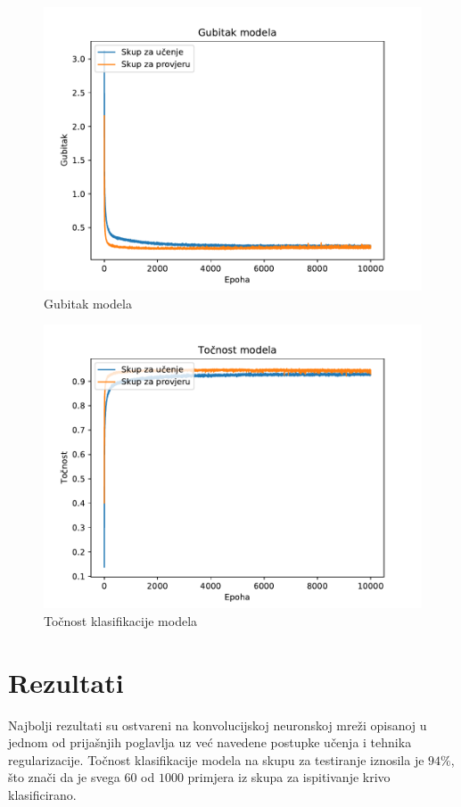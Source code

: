 \begin{figure}[!htbp]
    \centering
    \includegraphics[width=12cm]{images/model_loss.pdf}
    \caption{Gubitak modela}
    \label{fig:model_loss}
\end{figure}

\begin{figure}[!htbp]
    \centering
    \includegraphics[width=12cm]{images/model_acc.pdf}
    \caption{Točnost klasifikacije modela}
    \label{fig:model_acc}
\end{figure}

\section{Rezultati}

Najbolji rezultati su ostvareni na konvolucijskoj neuronskoj mreži opisanoj u jednom od prijašnjih poglavlja uz već navedene postupke učenja i tehnika regularizacije. Točnost klasifikacije modela na skupu za testiranje iznosila je $94\%$, što znači da je svega $60$ od $1000$ primjera iz skupa za ispitivanje krivo klasificirano.

